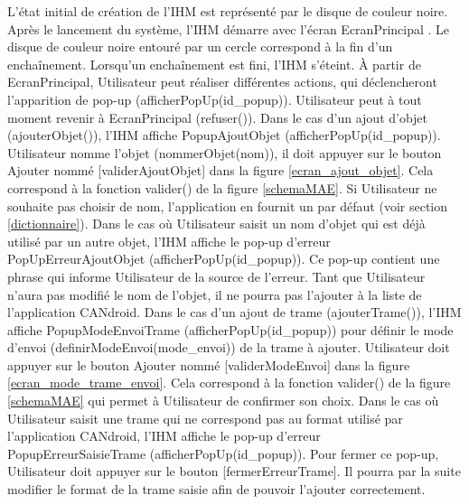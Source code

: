 \newpage

L'état initial de création de l'IHM est représenté par le disque de couleur noire. 
Après le lancement du système, l'IHM démarre avec l'écran {\guillemetleft} EcranPrincipal {\guillemetright}. 
Le disque de couleur noire entouré par un cercle correspond à la fin d'un enchaînement. 
Lorsqu'un enchaînement est fini, l'IHM s'éteint.
\newline
\newline
\`A partir de EcranPrincipal, Utilisateur peut réaliser différentes actions, qui déclencheront l'apparition de pop-up (afficherPopUp(id\_popup)). Utilisateur peut à tout moment revenir à EcranPrincipal (refuser()).
\newline
\newline
Dans le cas d'un ajout d'objet (ajouterObjet()), l'IHM affiche PopupAjoutObjet (afficherPopUp(id\_popup)). Utilisateur nomme l'objet (nommerObjet(nom)), il doit appuyer sur le bouton {\guillemetleft} Ajouter {\guillemetright} nommé [validerAjoutObjet] dans la figure \ref{ecran_ajout_objet}. Cela correspond à la fonction {\guillemetleft} valider() {\guillemetright} de la figure \ref{schemaMAE}. Si Utilisateur ne souhaite pas choisir de nom, l'application {\nomApplication} en fournit un par défaut (voir section \ref{dictionnaire}).
\newline
\newline
Dans le cas où Utilisateur saisit un nom d'objet qui est déjà utilisé par un autre objet, l'IHM affiche le pop-up d'erreur PopUpErreurAjoutObjet (afficherPopUp(id\_popup)). Ce pop-up contient une phrase qui informe Utilisateur de la source de l'erreur. Tant que Utilisateur n'aura pas modifié le nom de l'objet, il ne pourra pas l'ajouter à la liste de l'application CANdroid.
\newline
\newline
Dans le cas d'un ajout de trame (ajouterTrame()), l'IHM affiche PopupModeEnvoiTrame (afficherPopUp(id\_popup)) pour définir le mode d'envoi (definirModeEnvoi(mode\_envoi)) de la trame à ajouter. Utilisateur doit appuyer sur le bouton {\guillemetleft} Ajouter {\guillemetright} nommé [validerModeEnvoi] dans la figure \ref{ecran_mode_trame_envoi}. Cela correspond à la fonction {\guillemetleft} valider() {\guillemetright} de la figure \ref{schemaMAE} qui permet à Utilisateur de confirmer son choix.
\newline
\newline
Dans le cas où Utilisateur saisit une trame qui ne correspond pas au format utilisé par l'application CANdroid, l'IHM affiche le pop-up d'erreur PopupErreurSaisieTrame (afficherPopUp(id\_popup)). Pour fermer ce pop-up, Utilisateur doit appuyer sur le bouton [fermerErreurTrame]. Il pourra par la suite modifier le format de la trame saisie afin de pouvoir l'ajouter correctement.
